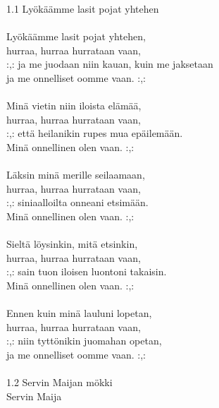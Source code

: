 
1.1 Lyökäämme lasit pojat yhtehen \\
\hspace{10mm} \\
            Lyökäämme lasit pojat yhtehen, \\
            hurraa, hurraa hurrataan vaan, \\
            :,: ja me juodaan niin kauan, kuin me jaksetaan \\
            ja me onnelliset oomme vaan. :,: \\
\hspace{10mm} \\
            Minä vietin niin iloista elämää, \\
            hurraa, hurraa hurrataan vaan, \\
            :,: että heilanikin rupes mua epäilemään. \\
            Minä onnellinen olen vaan. :,: \\
\hspace{10mm} \\
            Läksin minä merille seilaamaan, \\
            hurraa, hurraa hurrataan vaan, \\
            :,: siniaalloilta onneani etsimään. \\
            Minä onnellinen olen vaan. :,: \\
\hspace{10mm} \\
            Sieltä löysinkin, mitä etsinkin, \\
            hurraa, hurraa hurrataan vaan, \\
            :,: sain tuon iloisen luontoni takaisin. \\
            Minä onnellinen olen vaan. :,: \\
\hspace{10mm} \\
            Ennen kuin minä lauluni lopetan, \\
            hurraa, hurraa hurrataan vaan, \\
            :,: niin tyttönikin juomahan opetan, \\
            ja me onnelliset oomme vaan. :,: \\
\hspace{10mm} \\
1.2 Servin Maijan mökki \\
Servin Maija \\
